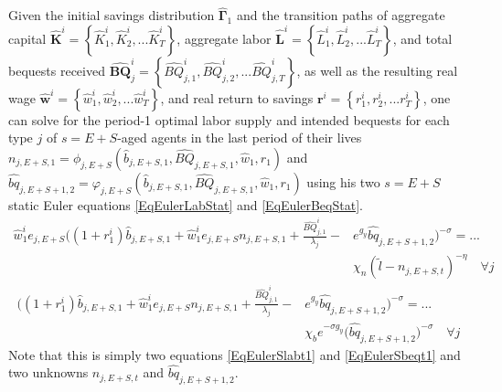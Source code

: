 \documentclass[letterpaper,12pt]{article}
\theoremstyle{definition}
\begin{document}
  Given the initial savings distribution $\bm{\hat{\Gamma}}_1$ and the transition paths of aggregate capital $\bm{\hat{K}}^i = \left\{\hat{K}_1^i,\hat{K}_2^i,...\hat{K}_T^i\right\}$, aggregate labor $\bm{\hat{L}}^i = \left\{\hat{L}_1^i,\hat{L}_2^i,...\hat{L}_T^i\right\}$, and total bequests received $\bm{\hat{BQ}}_j^i = \left\{\hat{BQ}_{j,1}^i,\hat{BQ}_{j,2}^i,...\hat{BQ}_{j,T}^i\right\}$, as well as the resulting real wage $\bm{\hat{w}}^i = \left\{\hat{w}_1^i,\hat{w}_2^i,...\hat{w}_T^i\right\}$, and real return to savings $\bm{r}^i = \left\{r_1^i,r_2^i,...r_T^i\right\}$, one can solve for the period-1 optimal labor supply and intended bequests for each type $j$ of $s=E+S$-aged agents in the last period of their lives $n_{j,E+S,1}=\phi_{j,E+S}(\hat{b}_{j,E+S,1},\hat{BQ}_{j,E+S,1},\hat{w}_1,r_1)$ and $\hat{bq}_{j,E+S+1,2}=\varphi_{j,E+S}(\hat{b}_{j,E+S,1},\hat{BQ}_{j,E+S,1},\hat{w}_1,r_1)$ using his two $s=E+S$ static Euler equations \eqref{EqEulerLabStat} and \eqref{EqEulerBeqStat}.
  \begin{equation}\label{EqEulerSlabt1}
    \begin{split}
      \hat{w}_1^i e_{j,E+S}\biggl(\left(1+r_1^i\right)\hat{b}_{j,E+S,1} + \hat{w}_1^i e_{j,E+S}n_{j,E+S,1} + \frac{\hat{BQ}_{j,1}^i}{\lambda_j} - &e^{g_y}\hat{bq}_{j,E+S+1,2}\biggr)^{-\sigma} = ... \\
      &\chi_n(\tilde{l} - n_{j,E+S,t})^{-\eta} \quad\forall j
    \end{split}
  \end{equation}
  \begin{equation}\label{EqEulerSbeqt1}
    \begin{split}
      \biggl(\left(1+r_1^i\right)\hat{b}_{j,E+S,1} + \hat{w}_1^i e_{j,E+S}n_{j,E+S,1} + \frac{\hat{BQ}_{j,1}^i}{\lambda_j} - &e^{g_y}\hat{bq}_{j,E+S+1,2}\biggr)^{-\sigma} = ... \\
      &\chi_b e^{-\sigma g_y}\bigl(\hat{bq}_{j,E+S+1,2}\bigr)^{-\sigma} \quad\forall j
    \end{split}
  \end{equation}
  Note that this is simply two equations \eqref{EqEulerSlabt1} and \eqref{EqEulerSbeqt1} and two unknowns $n_{j,E+S,t}$ and $\hat{bq}_{j,E+S+1,2}$.
\end{document}
